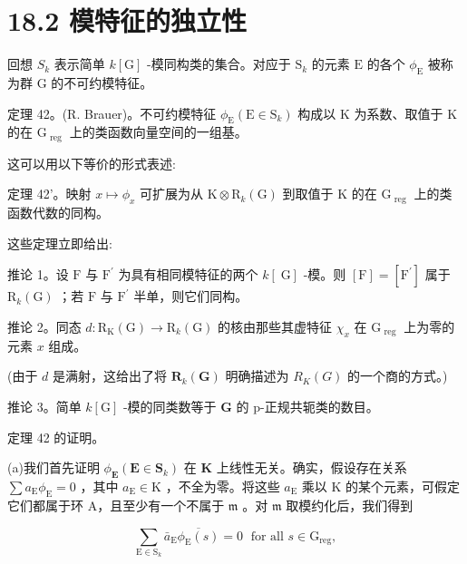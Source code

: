 \documentclass[10pt]{article}
\begin{document}
\section*{18.2 模特征的独立性}

回想 \({S}_{k}\) 表示简单 \(k\left\lbrack  \mathrm{G}\right\rbrack\) -模同构类的集合。对应于 \({\mathrm{S}}_{k}\) 的元素 \(\mathrm{E}\) 的各个 \({\phi }_{\mathrm{E}}\) 被称为群 \(\mathrm{G}\) 的不可约模特征。

定理 42。(R. Brauer)。不可约模特征 \({\phi }_{\mathrm{E}}\left( {\mathrm{E} \in  {\mathrm{S}}_{k}}\right)\) 构成以 \(\mathrm{K}\) 为系数、取值于 K 的在 \({\mathrm{G}}_{\text{ reg }}\) 上的类函数向量空间的一组基。

这可以用以下等价的形式表述:

定理 42’。映射 \(x \mapsto  {\phi }_{x}\) 可扩展为从 \(\mathrm{K} \otimes  {\mathrm{R}}_{k}\left( \mathrm{G}\right)\) 到取值于 \(\mathrm{K}\) 的在 \({\mathrm{G}}_{\text{ reg }}\) 上的类函数代数的同构。

这些定理立即给出:

推论 1。设 \(\mathrm{F}\) 与 \({\mathrm{F}}^{\prime }\) 为具有相同模特征的两个 \(k\left\lbrack  \mathrm{\;G}\right\rbrack\) -模。则 \(\left\lbrack  \mathrm{F}\right\rbrack   = \left\lbrack  {\mathrm{F}}^{\prime }\right\rbrack\) 属于 \({\mathrm{R}}_{k}\left( \mathrm{G}\right)\) ；若 \(\mathrm{F}\) 与 \({\mathrm{F}}^{\prime }\) 半单，则它们同构。

推论 2。同态 \(d : {\mathrm{R}}_{\mathrm{K}}\left( \mathrm{G}\right)  \rightarrow  {\mathrm{R}}_{k}\left( \mathrm{G}\right)\) 的核由那些其虚特征 \({\chi }_{x}\) 在 \({\mathrm{G}}_{\text{ reg }}\) 上为零的元素 \(x\) 组成。

(由于 \(d\) 是满射，这给出了将 \({\mathbf{R}}_{k}\left( \mathbf{G}\right)\) 明确描述为 \({R}_{K}\left( G\right)\) 的一个商的方式。)

推论 3。简单 \(k\left\lbrack  \mathrm{G}\right\rbrack\) -模的同类数等于 \(\mathbf{G}\) 的 p-正规共轭类的数目。

定理 42 的证明。

(a)我们首先证明 \({\phi }_{\mathbf{E}}\left( {\mathbf{E} \in  {\mathbf{S}}_{k}}\right)\) 在 \(\mathbf{K}\) 上线性无关。确实，假设存在关系 \(\sum {a}_{\mathrm{E}}{\phi }_{\mathrm{E}} = 0\) ，其中 \({a}_{\mathrm{E}} \in  \mathrm{K}\) ，不全为零。将这些 \({a}_{\mathrm{E}}\) 乘以 \(\mathrm{K}\) 的某个元素，可假定它们都属于环 A，且至少有一个不属于 \(\mathfrak{m}\) 。对 \(\mathfrak{m}\) 取模约化后，我们得到

\[
\mathop{\sum }\limits_{{\mathrm{E} \in  {\mathrm{S}}_{k}}}{\bar{a}}_{\mathrm{E}}\overline{{\phi }_{\mathrm{E}}\left( s\right) } = 0\;\text{ for all }s \in  {\mathrm{G}}_{\mathrm{{reg}}},
\]
\end{document}
